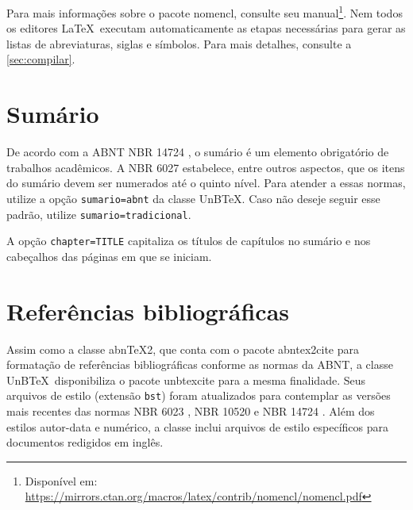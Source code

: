 Para mais informações sobre o pacote \textsf{nomencl}, consulte seu manual\footnote{Disponível em: \url{https://mirrors.ctan.org/macros/latex/contrib/nomencl/nomencl.pdf}}. Nem todos os editores \LaTeX\ executam automaticamente as etapas necessárias para gerar as listas de abreviaturas, siglas e símbolos. Para mais detalhes, consulte a \cref{sec:compilar}.


\section{Sumário}\label{sec:sumario}

De acordo com a ABNT NBR 14724 \cite{NBR14724:2024}, o sumário é um elemento obrigatório de trabalhos acadêmicos. A NBR 6027 \cite{NBR6027:2012} estabelece, entre outros aspectos, que os itens do sumário devem ser numerados até o quinto nível. Para atender a essas normas, utilize a opção \texttt{sumario=abnt} da classe UnB\TeX. Caso não deseje seguir esse padrão, utilize \texttt{sumario=tradicional}.

A opção \texttt{chapter=TITLE} capitaliza os títulos de capítulos no sumário e nos cabeçalhos das páginas em que se iniciam.

\section{Referências bibliográficas}\label{sec:referencias}

Assim como a classe abn\TeX2, que conta com o pacote \textsf{abntex2cite} para formatação de referências bibliográficas conforme as normas da ABNT, a classe UnB\TeX\ disponibiliza o pacote \textsf{unbtexcite} para a mesma finalidade. Seus arquivos de estilo (extensão \texttt{bst}) foram atualizados para contemplar as versões mais recentes das normas NBR 6023 \cite{NBR6023:2025}, NBR 10520 \cite{NBR10520:2023} e NBR 14724 \cite{NBR14724:2024}. Além dos estilos autor-data e numérico, a classe inclui arquivos de estilo específicos para documentos redigidos em inglês.

